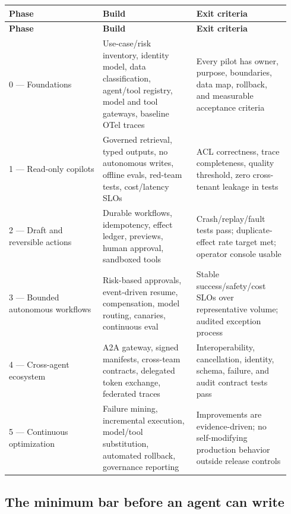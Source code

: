 \BookTableStart
\small
\begin{longtable}{@{}Y{0.3133\linewidth}Y{0.3133\linewidth}Y{0.3133\linewidth}@{}}
\color{white}\bfseries \textbf{Phase} & \color{white}\bfseries \textbf{Build} & \color{white}\bfseries \textbf{Exit criteria} \\
\endfirsthead
{}
\color{white}\bfseries \textbf{Phase} & \color{white}\bfseries \textbf{Build} & \color{white}\bfseries \textbf{Exit criteria} \\
 — Foundations & Use-case/risk inventory, identity model, data classification, agent/tool registry, model and tool gateways, baseline OTel traces & Every pilot has owner, purpose, boundaries, data map, rollback, and measurable acceptance criteria \\
1 — Read-only copilots & Governed retrieval, typed outputs, no autonomous writes, offline evals, red-team tests, cost/latency SLOs & ACL correctness, trace completeness, quality threshold, zero cross-tenant leakage in tests \\
2 — Draft and reversible actions & Durable workflows, idempotency, effect ledger, previews, human approval, sandboxed tools & Crash/replay/fault tests pass; duplicate-effect rate target met; operator console usable \\
3 — Bounded autonomous workflows & Risk-based approvals, event-driven resume, compensation, model routing, canaries, continuous eval & Stable success/safety/cost SLOs over representative volume; audited exception process \\
4 — Cross-agent ecosystem & A2A gateway, signed manifests, cross-team contracts, delegated token exchange, federated traces & Interoperability, cancellation, identity, schema, failure, and audit contract tests pass \\
5 — Continuous optimization & Failure mining, incremental execution, model/tool substitution, automated rollback, governance reporting & Improvements are evidence-driven; no self-modifying production behavior outside release controls \\
\end{longtable}
\BookTableEnd

\subsection{The minimum bar before an agent can write}

